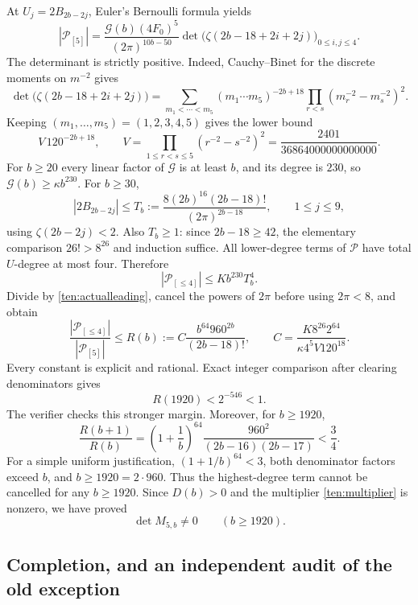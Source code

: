 At $U_j=2B_{2b-2j}$, Euler's Bernoulli formula yields
\begin{equation}\label{ten:actualleading}
 |\mathscr P_{[5]}|
 =\frac{\mathscr G(b)(4F_0)^5}{(2\pi)^{10b-50}}
       \det\bigl(\zeta(2b-18+2i+2j)\bigr)_{0\le i,j\le4}.
\end{equation}
The determinant is strictly positive.  Indeed, Cauchy--Binet for
the discrete moments on $m^{-2}$ gives
\[
 \det\bigl(\zeta(2b-18+2i+2j)\bigr)
 =\sum_{m_1<\cdots<m_5}(m_1\cdots m_5)^{-2b+18}
                  \prod_{r<s}(m_r^{-2}-m_s^{-2})^2.
\]
Keeping $(m_1,\ldots,m_5)=(1,2,3,4,5)$ gives the lower bound
\[
 V\,120^{-2b+18},\qquad
 V=\prod_{1\le r<s\le5}(r^{-2}-s^{-2})^2
          =\frac{2401}{36864000000000000}.
\]
For $b\ge20$ every linear factor of $\mathscr G$ is at least $b$,
and its degree is $230$, so $\mathscr G(b)\ge\kappa b^{230}$.
For $b\ge30$,
\[
 |2B_{2b-2j}|\le
 T_b:=\frac{8(2b)^{16}(2b-18)!}{(2\pi)^{2b-18}},
 \qquad 1\le j\le9,
\]
using $\zeta(2b-2j)<2$.  Also $T_b\ge1$: since $2b-18\ge42$,
the elementary comparison $26!>8^{26}$ and induction suffice.
All lower-degree terms of $\mathscr P$ have total $U$-degree at
most four.  Therefore
\[
 |\mathscr P_{[\le4]}|\le Kb^{230}T_b^4.
\]
Divide by \eqref{ten:actualleading}, cancel the powers of $2\pi$
before using $2\pi<8$, and obtain
\begin{equation}\label{ten:bound}
 \frac{|\mathscr P_{[\le4]}|}{|\mathscr P_{[5]}|}
 \le R(b):=C\frac{b^{64}960^{2b}}{(2b-18)!},\qquad
 C=\frac{K8^{26}2^{64}}{\kappa4^5V120^{18}}.
\end{equation}
Every constant is explicit and rational.  Exact integer comparison
after clearing denominators gives
\[
 R(1920)<2^{-546}<1.
\]
The verifier checks this stronger margin.  Moreover, for $b\ge1920$,
\[
 \frac{R(b+1)}{R(b)}=
 \left(1+\frac1b\right)^{64}
      \frac{960^2}{(2b-16)(2b-17)}<\frac34.
\]
For a simple uniform justification, $(1+1/b)^{64}<3$,
both denominator factors exceed $b$, and $b\ge1920=2\cdot960$.
Thus the highest-degree term cannot be cancelled for any $b\ge1920$.
Since $D(b)>0$ and the multiplier \eqref{ten:multiplier} is nonzero,
we have proved
\begin{equation}\label{ten:eventual}
             \det M_{5,b}\ne0\qquad(b\ge1920).
\end{equation}

\subsection{Completion, and an independent audit of the old exception}

